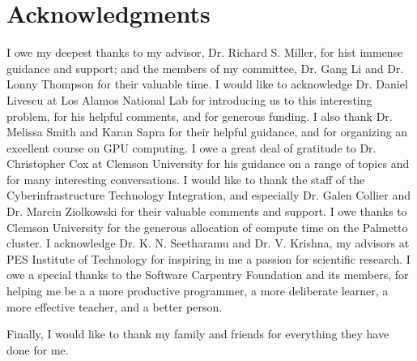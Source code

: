 \chapter*{Acknowledgments}

I owe my deepest thanks
to my advisor, Dr. Richard S. Miller,
for hist immense guidance and support;
and the members of my committee,
Dr. Gang Li and Dr. Lonny Thompson
for their valuable time.
I would like to acknowledge
Dr. Daniel Livescu at Los Alamos National Lab
for introducing us to this interesting problem,
for his helpful comments,
and for generous funding.
I also thank
Dr. Melissa Smith and Karan Sapra
for their helpful guidance,
and for organizing an excellent course on GPU computing.
I owe a great deal of gratitude to
Dr. Christopher Cox at Clemson University
for his guidance on a range of topics
and for many interesting conversations.
I would like to thank the
staff of the Cyberinfrastructure Technology Integration,
and especially
Dr. Galen Collier and Dr. Marcin Ziolkowski
for their valuable comments and support.
I owe thanks to Clemson University for the generous
allocation of compute time on the Palmetto cluster.
I acknowledge
Dr. K. N. Seetharamu and Dr. V. Krishna,
my advisors at PES Institute of Technology
for inspiring in me a passion for
scientific research.
I owe a special thanks to the
Software Carpentry Foundation
and its members,
for helping me be a
a more productive programmer,
a more deliberate learner,
a more effective teacher,
and a better person.

Finally,
I would like to thank my family and friends
for everything they have done for me.
